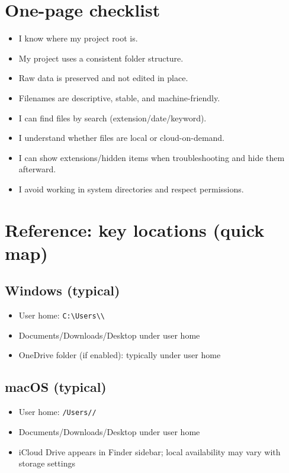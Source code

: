 \section{One-page checklist}
\begin{itemize}
\item I know where my project root is.
\item My project uses a consistent folder structure.
\item Raw data is preserved and not edited in place.
\item Filenames are descriptive, stable, and machine-friendly.
\item I can find files by search (extension/date/keyword).
\item I understand whether files are local or cloud-on-demand.
\item I can show extensions/hidden items when troubleshooting and hide them afterward.
\item I avoid working in system directories and respect permissions.
\end{itemize}

\section{Reference: key locations (quick map)}
\subsection{Windows (typical)}
\begin{itemize}
\item User home: \texttt{C:\textbackslash Users\textbackslash \textbackslash}
\item Documents/Downloads/Desktop under user home
\item OneDrive folder (if enabled): typically under user home
\end{itemize}

\subsection{macOS (typical)}
\begin{itemize}
\item User home: \texttt{/Users//}
\item Documents/Downloads/Desktop under user home
\item iCloud Drive appears in Finder sidebar; local availability may vary with storage settings
\end{itemize}

